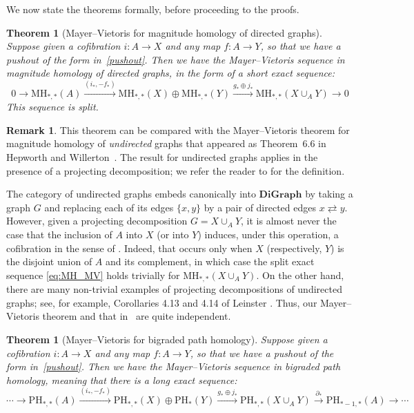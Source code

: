 \documentclass[a4paper, 11 pt, oneside, reqno]{amsart}
\numberwithin{lemma}{section}
\newtheorem{theorem}[lemma]{Theorem}
\theoremstyle{definition}
\newtheorem{remark}[lemma]{Remark}
\newcommand{\demph}[1]{\emph{#1}}
\newcommand{\cn}[1]{\mathbf{#1}}
\newcommand{\DiGraph}{\cn{DiGraph}}
\newcommand{\MH}{\mathrm{MH}}
\newcommand{\PH}{\mathrm{PH}}
\begin{document}
We now state the theorems formally, before proceeding to the proofs.

\begin{theorem}[Mayer--Vietoris for 
magnitude homology of directed graphs]\label{Mayer--Vietoris-magnitude}
    Suppose given a cofibration $i\colon A\to X$
    and any map $f\colon A\to Y$, so that we have a pushout of the form in~\eqref{pushout}.
    Then we have the \demph{Mayer--Vietoris sequence}
    in magnitude homology of directed graphs, 
    in the form of a short  exact sequence:
    \begin{equation}\label{eq:MH_MV}
        0
        \to
        \MH_{\ast,\ast}(A)
        \xrightarrow{(i_\ast,-f_\ast)}
        \MH_{\ast,\ast}(X)\oplus \MH_{\ast,\ast}(Y)
        \xrightarrow{g_\ast\oplus j_\ast}
        \MH_{\ast,\ast} (X\cup_A Y)
        \to
        0
    \end{equation}
    This sequence is split.
\end{theorem}

\begin{remark}
\label{rmk:MV_comparison}
This theorem can be compared with  the Mayer--Vietoris theorem for magnitude homology of \emph{undirected} graphs that appeared as Theorem~6.6 in Hepworth and Willerton~\cite{HepworthWillerton2017}. The result for undirected graphs applies in the presence of a projecting decomposition; we refer the reader to \cite[Definition 6.3]{HepworthWillerton2017} for the definition.

The category of undirected graphs embeds canonically into \(\DiGraph\) by taking a graph \(G\) and replacing each of its edges \(\{x,y\}\) by a pair of directed edges \(x \rightleftarrows y\). However, given a projecting decomposition \(G = X \cup_A Y\), it is almost never the case that the inclusion of \(A\) into \(X\) (or into \(Y\)) induces, under this operation, a cofibration in the sense of . Indeed, that occurs only when \(X\) (respectively, \(Y\)) is the disjoint union of \(A\) and its complement, in which case the split exact sequence \eqref{eq:MH_MV} holds trivially for \(\MH_{\ast,\ast}(X \cup_A Y)\). On the other hand, there are many non-trivial examples of projecting decompositions of undirected graphs; see, for example, Corollaries 4.13 and 4.14 of Leinster \cite{LeinsterGraph}. Thus, our Mayer--Vietoris theorem and that in~\cite{HepworthWillerton2017} are quite independent.
\end{remark}

\begin{theorem}[Mayer--Vietoris for 
bigraded path homology]\label{Mayer--Vietoris-path}
    Suppose given a cofibration $i\colon A\to X$
    and any map $f\colon A\to Y$, so that we have a pushout
    of the form in~\eqref{pushout}.
    Then we have the \demph{Mayer--Vietoris sequence}
    in bigraded path homology, meaning that there is a
    long exact sequence:
    \[
        \cdots
        \to
        \PH_{\ast,\ast}(A)
        \xrightarrow{(i_\ast,-f_\ast)}
        \PH_{\ast,\ast}(X)\oplus\PH_\ast(Y)
        \xrightarrow{g_\ast\oplus j_\ast}
        \PH_{\ast,\ast} (X\cup_A Y)
        \xrightarrow{\partial_\ast}
        \PH_{\ast-1,\ast}(A)
        \to
        \cdots
    \]
\end{theorem}
\end{document}
